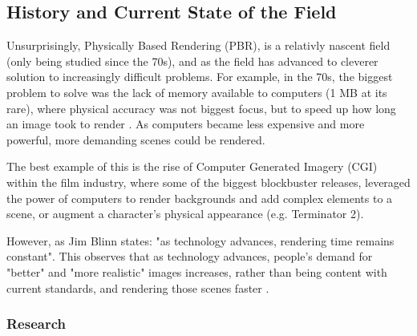 \documentclass[../main.tex]{subfiles}
\begin{document}
\subsection{History and Current State of the Field}
Unsurprisingly, Physically Based Rendering (PBR), is a relativly nascent field (only being studied since the 70s), and as the field has advanced to cleverer solution to increasingly difficult problems. 
For example, in the 70s, the biggest problem to solve was the lack of memory available to computers (1 MB at its rare), where physical accuracy was not biggest focus, but to speed up how long an image took to render \cite{pharrPhysicallyBasedRendering2016}. As computers became less expensive and more powerful, more demanding scenes could be rendered.

The best example of this is the rise of Computer Generated Imagery (CGI) within the film industry, where some of the biggest blockbuster releases, leveraged the power of computers to render backgrounds and add complex elements to a scene, or augment a character's physical appearance (e.g. Terminator 2).

However, as Jim Blinn states: "as technology advances, rendering time remains constant". This observes that as technology advances, people's demand for "better" and "more realistic" images increases, rather than being content with current standards, and rendering those scenes faster \cite{pharrPhysicallyBasedRendering2016}.
\subsubsection{Research}
\end{document}

